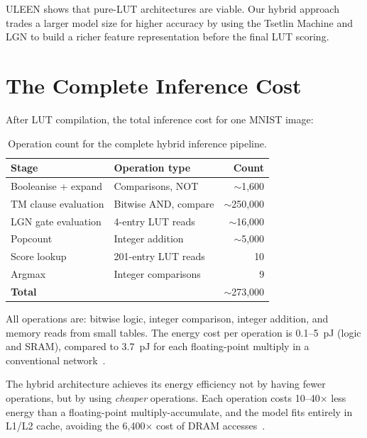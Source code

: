\begin{engineernote}
ULEEN shows that pure-LUT architectures are viable. Our hybrid
approach trades a larger model size for higher accuracy by using the
Tsetlin Machine and LGN to build a richer feature representation
before the final LUT scoring.
\end{engineernote}


\section{The Complete Inference Cost}
\label{sec:inference-cost}

After LUT compilation, the total inference cost for one MNIST image:

\begin{table}[htbp]
\centering
\caption{Operation count for the complete hybrid inference pipeline.}
\label{tab:inference-cost}
\begin{tabular}{@{}llr@{}}
  \toprule
  \textbf{Stage} & \textbf{Operation type} & \textbf{Count} \\
  \midrule
  Booleanise + expand & Comparisons, NOT & $\sim$1,600 \\
  TM clause evaluation & Bitwise AND, compare & $\sim$250,000 \\
  LGN gate evaluation & 4-entry LUT reads & $\sim$16,000 \\
  Popcount & Integer addition & $\sim$5,000 \\
  Score lookup & 201-entry LUT reads & 10 \\
  Argmax & Integer comparisons & 9 \\
  \midrule
  \textbf{Total} & & $\sim$273,000 \\
  \bottomrule
\end{tabular}
\end{table}

All operations are: bitwise logic, integer comparison, integer
addition, and memory reads from small tables. The energy cost per
operation is 0.1--5~pJ (logic and SRAM), compared to 3.7~pJ for each
floating-point multiply in a conventional network~\cite{horowitz2014energy}.

\begin{keyinsight}
The hybrid architecture achieves its energy efficiency not by having
fewer operations, but by using \emph{cheaper} operations. Each
operation costs 10--40$\times$ less energy than a floating-point
multiply-accumulate, and the model fits entirely in L1/L2 cache,
avoiding the 6,400$\times$ cost of DRAM accesses~\cite{horowitz2014energy}.
\end{keyinsight}


